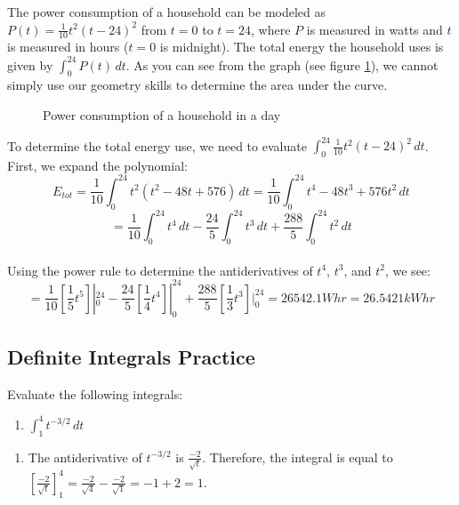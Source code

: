 The power consumption of a household can be modeled as 
$P(t) = \frac{1}{10} t^2 (t - 24)^2$ from $t = 0$ to $t = 24$, where 
$P$ is measured in watts and $t$ is measured in hours ($t = 0$ is 
midnight). The total energy the household uses is given by $\int_{0}^{24} 
P(t)\,dt$. As you can see from the graph (see figure \ref{fig:power}), 
we cannot simply use our geometry skills to determine the area under 
the curve. 

\begin{figure}
	\caption{Power consumption of a household in a day}
	\label{fig:power}
\end{figure}

To determine the total energy use, we need to evaluate $\int_{0}^{24} 
\frac{1}{10}t^2(t-24)^2\,dt$. First, we expand the polynomial:\\
$$E_{tot} = \frac{1}{10} \int_{0}^{24} t^2 (t^2-48t+576)\,dt = 
\frac{1}{10}\int_{0}^{24} t^4 - 48t^3 + 576t^2\,dt$$
$$= \frac{1}{10}\int_{0}^{24} t^4\,dt - \frac{24}{5}\int_{0}^{24} 
t^3\,dt + \frac{288}{5}\int_{0}^{24} t^2\,dt$$\\
Using the power rule to determine the antiderivatives of $t^4$, $t^3$, 
and $t^2$, we see:\\
$$=\frac{1}{10}[\frac{1}{5}t^5]|_{0}^{24} - \frac{24}{5}
[\frac{1}{4}t^4]|_{0}^{24} + \frac{288}{5}[\frac{1}{3}t^3]|_{0}^{24} 
= 26542.1 Whr = 26.5421 kWhr$$

\subsection{Definite Integrals Practice}
\begin{Exercise}[label=FTC2]
	Evaluate the following integrals:
	\begin{enumerate}
	\item $\int_1^4 t^{-3/2}\,dt$
	\end{enumerate}
\end{Exercise}

\begin{Answer}[ref=FTC2]
	\begin{enumerate}
	\item The antiderivative of $t^{-3/2}$ is $\frac{-2}{\sqrt{t}}$. 
	Therefore, the integral is equal to $[\frac{-2}{\sqrt{t}}]_1^4 = 
	\frac{-2}{\sqrt{4}} - \frac{-2}{\sqrt{1}} = -1 + 2 = 1$. 
	\end{enumerate}
\end{Answer}

